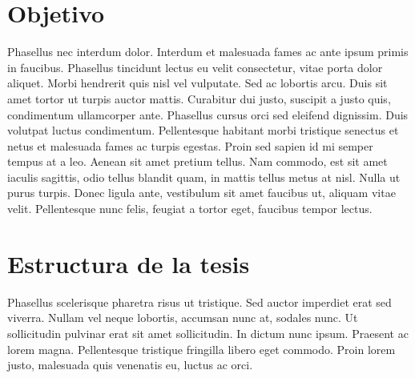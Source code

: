 \section{Objetivo}
Phasellus nec interdum dolor. Interdum et malesuada fames ac ante ipsum primis in faucibus. Phasellus tincidunt lectus eu velit consectetur, vitae porta dolor aliquet. Morbi hendrerit quis nisl vel vulputate. Sed ac lobortis arcu. Duis sit amet tortor ut turpis auctor mattis. Curabitur dui justo, suscipit a justo quis, condimentum ullamcorper ante. Phasellus cursus orci sed eleifend dignissim. Duis volutpat luctus condimentum. Pellentesque habitant morbi tristique senectus et netus et malesuada fames ac turpis egestas. Proin sed sapien id mi semper tempus at a leo. Aenean sit amet pretium tellus. Nam commodo, est sit amet iaculis sagittis, odio tellus blandit quam, in mattis tellus metus at nisl. Nulla ut purus turpis. Donec ligula ante, vestibulum sit amet faucibus ut, aliquam vitae velit. Pellentesque nunc felis, feugiat a tortor eget, faucibus tempor lectus.

\section{Estructura de la tesis}
Phasellus scelerisque pharetra risus ut tristique. Sed auctor imperdiet erat sed viverra. Nullam vel neque lobortis, accumsan nunc at, sodales nunc. Ut sollicitudin pulvinar erat sit amet sollicitudin. In dictum nunc ipsum. Praesent ac lorem magna. Pellentesque tristique fringilla libero eget commodo. Proin lorem justo, malesuada quis venenatis eu, luctus ac orci.